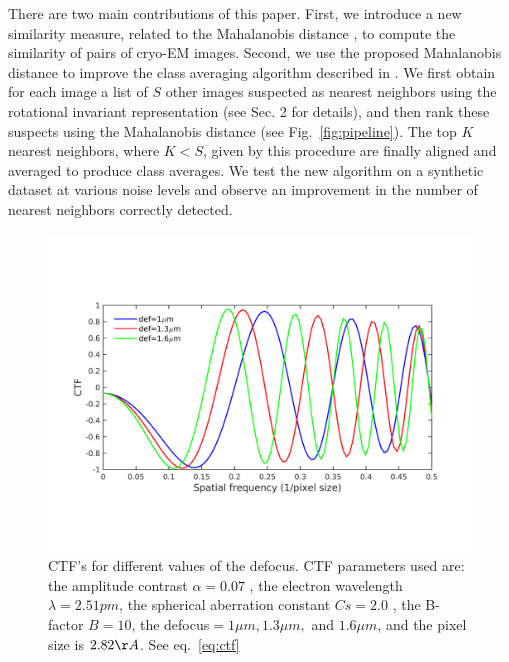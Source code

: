 \documentclass{article}
\begin{document}
There are two main contributions of this paper. First, we introduce a new similarity measure, related to the Mahalanobis distance \cite{mah}, to compute the similarity of pairs of cryo-EM images. Second, we use the proposed Mahalanobis distance to improve the class averaging algorithm described in \cite{zhao}. We first obtain for each image a list of $S$ other images suspected as nearest neighbors using the rotational invariant representation (see Sec. 2 for details), and then rank these suspects using the Mahalanobis distance (see Fig.~\ref{fig:pipeline}). The top $K$ nearest neighbors, where $K<S$, given by this procedure are finally aligned and averaged to produce class averages. We test the new algorithm on a synthetic dataset at various noise levels and observe an improvement in the number of nearest neighbors correctly detected.

\begin{figure}
\begin{center}
\vspace{-.2in}
\includegraphics[scale=0.35]{ctfeg_fig.png}
\vspace{-.5in}
\caption{CTF's for different values of the defocus. CTF parameters used are: the amplitude contrast $\alpha = 0.07$
, the electron wavelength $\lambda= 2.51pm$, the spherical aberration constant $Cs=2.0$
, the B-factor $B=10$, the defocus$=1\mu m, 1.3\mu m,$ and
$1.6\mu m$, and the pixel size is $2.82\AA$. See 
eq.~\eqref{eq:ctf}}\label{fig:ctf}
\end{center}
\vspace{-.2in}
\end{figure}
 
\end{document}
